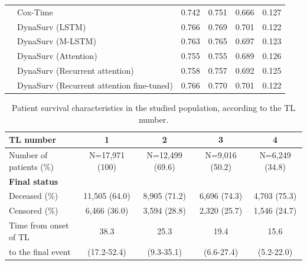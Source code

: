 \documentclass[a4paper,10pt]{article}
\begin{document}
\begin{table}[H]
{\begin{tabular}{llcccc}
 & Cox-Time & 0.742 & 0.751 & 0.666 & 0.127 \\
 & DynaSurv (LSTM) & 0.766 & 0.769 & 0.701 & 0.122 \\
 & DynaSurv (M-LSTM) & 0.763 & 0.765 & 0.697 & 0.123 \\
 & DynaSurv (Attention) & 0.755 & 0.755 & 0.689 & 0.126 \\
 & DynaSurv (Recurrent attention) & 0.758 & 0.757 & 0.692 & 0.125 \\
 & DynaSurv (Recurrent attention fine-tuned) & 0.766 & 0.770 & 0.701 & 0.122 \\
\bottomrule
\end{tabular}
}
\label{tab:results1}
\end{table}

\begin{table}[H]
\centering
\caption{Patient survival characteristics in the studied population, according to the TL number.}
\begin{tabular}{lcccc}
\toprule
\textbf{TL number} & \textbf{1} & \textbf{2} & \textbf{3} & \textbf{4} \\
\midrule
Number of patients (\%) & N=17,971 (100) & N=12,499 (69.6) & N=9,016 (50.2) & N=6,249 (34.8) \\
\textbf{Final status} & & & & \\
Deceased (\%) & 11,505 (64.0) & 8,905 (71.2) & 6,696 (74.3) & 4,703 (75.3) \\
Censored (\%) & 6,466 (36.0) & 3,594 (28.8) & 2,320 (25.7) & 1,546 (24.7) \\
Time from onset of TL & 38.3 & 25.3 & 19.4 & 15.6 \\
to the final event & (17.2-52.4) & (9.3-35.1) & (6.6-27.4) & (5.2-22.0) \\
\bottomrule
\end{tabular}
\end{table}
\end{document}
